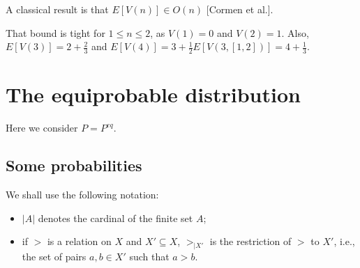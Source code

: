 \documentclass[version=3.21, pagesize, twoside=off, bibliography=totoc, DIV=calc, fontsize=12pt, a4paper]{scrartcl}
\begin{document}
A classical result is that $E[V(n)] \in O(n)$ [Cormen et al.].

That bound is tight for $1 ≤ n ≤ 2$, as $V(1) = 0$ and $V(2) = 1$. Also, $E[V(3)] = 2 + \frac{2}{3}$ and $E[V(4)] = 3 + \frac{1}{2}E[V(3, [1, 2])] = 4 + \frac{1}{3}$.

\section{The equiprobable distribution}
Here we consider $P = P^\mathit{eq}$. 

\subsection{Some probabilities}
We shall use the following notation:
\begin{itemize}
    \item $|A|$ denotes the cardinal of the finite set $A$;
    \item if $>$ is a relation on $X$ and $X' \subseteq{X}$, $>_{|X'}$ is the restriction of $>$ to $X'$, i.e., the set of pairs $a,b \in X'$ such that $a>b$.
\end{itemize}
\end{document}
